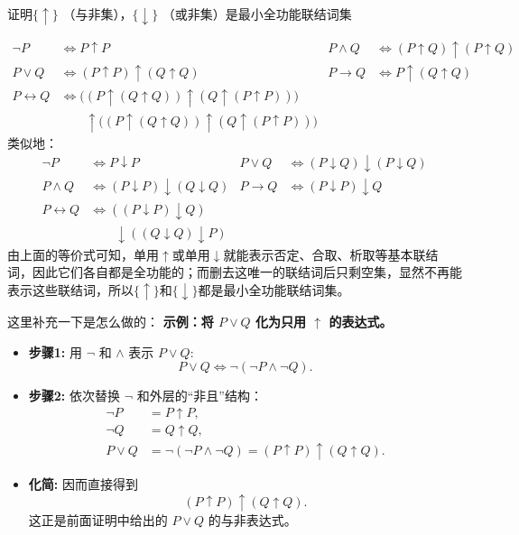 \begin{example}{}{}
    证明$\{\uparrow\}$ （与非集），$\{\downarrow\}$ （或非集）是最小全功能联结词集
\end{example}
\begin{solution}
\begin{align*}
    \neg P &\Leftrightarrow P \uparrow P &
    P \land Q &\Leftrightarrow (P \uparrow Q) \uparrow (P \uparrow Q) \\
    P \lor Q &\Leftrightarrow (P \uparrow P) \uparrow (Q \uparrow Q) &
    P \rightarrow Q &\Leftrightarrow P \uparrow (Q \uparrow Q) \\
    P \leftrightarrow Q &\Leftrightarrow \big((P \uparrow (Q \uparrow Q)) \uparrow (Q \uparrow (P \uparrow P))\big) \\
    &\qquad \uparrow \big((P \uparrow (Q \uparrow Q)) \uparrow (Q \uparrow (P \uparrow P))\big)
\end{align*}
类似地：
\begin{align*}
    \neg P &\Leftrightarrow P \downarrow P &
    P \lor Q &\Leftrightarrow (P \downarrow Q) \downarrow (P \downarrow Q) \\
    P \land Q &\Leftrightarrow (P \downarrow P) \downarrow (Q \downarrow Q) &
    P \rightarrow Q &\Leftrightarrow (P \downarrow P) \downarrow Q \\
    P \leftrightarrow Q &\Leftrightarrow ((P \downarrow P) \downarrow Q) \\
    &\qquad \downarrow ((Q \downarrow Q) \downarrow P)
\end{align*}
由上面的等价式可知，单用$\uparrow$或单用$\downarrow$就能表示否定、合取、析取等基本联结词，因此它们各自都是全功能的；而删去这唯一的联结词后只剩空集，显然不再能表示这些联结词，所以$\{\uparrow\}$和$\{\downarrow\}$都是最小全功能联结词集。
\end{solution}
这里补充一下是怎么做的：
\textbf{示例：将 $P \lor Q$ 化为只用 $\uparrow$ 的表达式。}
\begin{itemize}
    \item \textbf{步骤1:} 用 $\neg$ 和 $\land$ 表示 $P \lor Q$:
    \[
    P \lor Q \Leftrightarrow \neg(\neg P \land \neg Q).
    \]
    \item \textbf{步骤2:} 依次替换 $\neg$ 和外层的“非且”结构：
    \begin{align*}
        \neg P &=P \uparrow P, \\
        \neg Q &= Q \uparrow Q, \\
        P \lor Q &= \neg(\neg P \land \neg Q)= (P \uparrow P) \uparrow (Q \uparrow Q).
    \end{align*}
    \item \textbf{化简:} 因而直接得到
    \[
    (P \uparrow P) \uparrow (Q \uparrow Q).
    \]
    这正是前面证明中给出的 $P \lor Q$ 的与非表达式。
\end{itemize}
